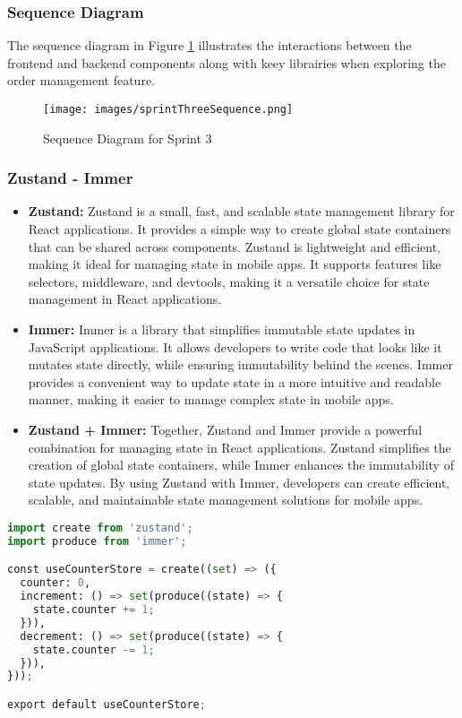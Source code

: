 \subsubsection{Sequence Diagram}

The sequence diagram in Figure \ref{fig:sequence_sprint3} illustrates the interactions between the frontend and backend components along with keey librairies when exploring the order management feature.

\begin{figure}[H]
    \centering
    \texttt{[image: images/sprintThreeSequence.png]}
    \caption{Sequence Diagram for Sprint 3}
    \label{fig:sequence_sprint3}
\end{figure}

\subsubsection{Zustand - Immer}

\begin{itemize}
    \item \textbf{Zustand:} Zustand is a small, fast, and scalable state management library for React applications. It provides a simple way to create global state containers that can be shared across components. Zustand is lightweight and efficient, making it ideal for managing state in mobile apps. It supports features like selectors, middleware, and devtools, making it a versatile choice for state management in React applications.
    \item \textbf{Immer:} Immer is a library that simplifies immutable state updates in JavaScript applications. It allows developers to write code that looks like it mutates state directly, while ensuring immutability behind the scenes. Immer provides a convenient way to update state in a more intuitive and readable manner, making it easier to manage complex state in mobile apps.
    \item \textbf{Zustand + Immer:} Together, Zustand and Immer provide a powerful combination for managing state in React applications. Zustand simplifies the creation of global state containers, while Immer enhances the immutability of state updates. By using Zustand with Immer, developers can create efficient, scalable, and maintainable state management solutions for mobile apps.
\end{itemize}

\begin{lstlisting}[language=Python, caption=Zustand + Immer Example, frame=single, framerule=0.5pt]
import create from 'zustand';
import produce from 'immer';

const useCounterStore = create((set) => ({
  counter: 0,
  increment: () => set(produce((state) => {
    state.counter += 1;
  })),
  decrement: () => set(produce((state) => {
    state.counter -= 1;
  })),
}));

export default useCounterStore;
\end{lstlisting}

